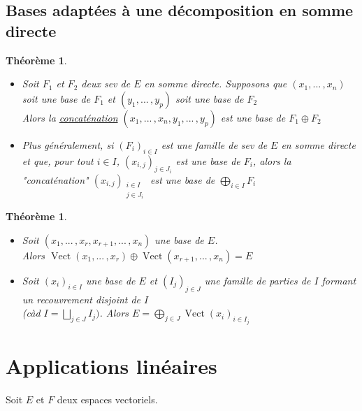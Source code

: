 \documentclass[10pt,a4paper]{article}
\theoremstyle{plain}
\newtheorem{theorem}[proposition]{Théorème}
\theoremstyle{definition}
\DeclareMathOperator{\vect}{Vect}
\begin{document}
\subsection{Bases adaptées à une décomposition en somme directe}
\begin{theorem}
\hfill
\begin{itemize}
\item Soit $F_1$ et $F_2$ deux sev de $E$ en somme directe. Supposons que $(x_1, ...\, , x_n)$ soit une base de $F_1$ et $(y_1, ...\, , y_p)$ soit une base de $F_2$ \\
Alors la \uline{concaténation} $(x_1, ...\, , x_n, y_1, ...\, ,y_p)$ est une base de $F_1 \oplus F_2$
\item Plus généralement, si $(F_i)_{i \in I}$ est une famille de sev de $E$ en somme directe et que, pour tout $i \in I$, $(x_{i, j})_{j \in J_i}$ est une base de $F_i$, alors la "concaténation" $(x_{i, j})_{\substack{i \in I \\ j \in J_i}}$ est une base de $\bigoplus\limits_{i \in I} F_i$ 
\end{itemize}
\end{theorem}

\pagebreak

\begin{theorem}
\hfill
\begin{itemize}
\item Soit $(x_1, ...\, , x_r, x_{r + 1}, ...\, , x_n)$ une base de $E$. \\
Alors $\vect(x_1, ...\, , x_r) \oplus \vect(x_{r + 1}, ...\, , x_n) = E$
\item Soit $(x_i)_{i \in I}$ une base de $E$ et $(I_j)_{j \in J}$ une famille de parties de $I$ formant un recouvrement disjoint de $I$ \\
(càd $I = \bigsqcup\limits_{j \in J} I_j)$. Alors $E = \bigoplus\limits_{j \in J} \vect(x_i)_{i \in I_j}$
\end{itemize}
\end{theorem}

\section{Applications linéaires}
Soit $E$ et $F$ deux espaces vectoriels.
\end{document}

